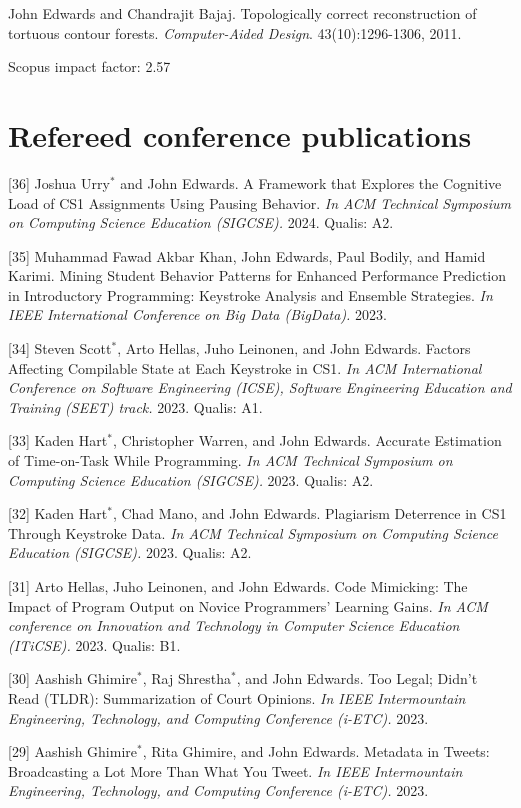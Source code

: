 \documentclass[margin,line]{res}
\newcommand{\pubunder}[1]{#1}
\newcommand{\jnum}[1]{[#1]}
\newcommand{\cnum}[1]{[#1]}
\begin{document}
\begin{resume}
\jnum{1} \protect \pubunder{John Edwards} and Chandrajit Bajaj. Topologically correct reconstruction of tortuous contour forests. \textit{Computer-Aided Design}. 43(10):1296-1306, 2011.
\begin{IMPACT}
Scopus impact factor: 2.57 %
\end{IMPACT}


\section{\sc Refereed conference publications}
\cnum{36} Joshua Urry$^*$ and John Edwards. A Framework that Explores the Cognitive Load of CS1 Assignments Using Pausing Behavior. \textit{In ACM Technical Symposium on Computing Science Education (SIGCSE).} 2024. Qualis: A2.

\cnum{35} Muhammad Fawad Akbar Khan, John Edwards, Paul Bodily, and Hamid Karimi. Mining Student Behavior Patterns for Enhanced Performance Prediction in Introductory Programming: Keystroke Analysis and Ensemble Strategies. \textit{In IEEE International Conference on Big Data (BigData).} 2023.

\cnum{34} Steven Scott$^*$, Arto Hellas, Juho Leinonen, and John Edwards. Factors Affecting Compilable State at Each Keystroke in CS1. \textit{In ACM International Conference on Software Engineering (ICSE), Software Engineering Education and Training (SEET) track.} 2023. Qualis: A1.

\cnum{33} Kaden Hart$^*$, Christopher Warren, and John Edwards. Accurate Estimation of Time-on-Task While Programming. \textit{In ACM Technical Symposium on Computing Science Education (SIGCSE).} 2023. Qualis: A2.

\cnum{32} Kaden Hart$^*$, Chad Mano, and John Edwards. Plagiarism Deterrence in CS1 Through Keystroke Data. \textit{In ACM Technical Symposium on Computing Science Education (SIGCSE).} 2023. Qualis: A2.

\cnum{31} Arto Hellas, Juho Leinonen, and John Edwards. Code Mimicking: The Impact of Program Output on Novice Programmers’ Learning Gains. \textit{In ACM conference on Innovation and Technology in Computer Science Education (ITiCSE).} 2023. Qualis: B1.

\cnum{30} Aashish Ghimire$^*$, Raj Shrestha$^*$, and John Edwards. Too Legal; Didn’t Read (TLDR): Summarization of Court Opinions. \textit{In IEEE Intermountain Engineering, Technology, and Computing Conference (i-ETC).} 2023.

\cnum{29} Aashish Ghimire$^*$, Rita Ghimire, and John Edwards. Metadata in Tweets: Broadcasting a Lot More Than What You Tweet. \textit{In IEEE Intermountain Engineering, Technology, and Computing Conference (i-ETC).} 2023.


\end{resume}
\end{document}
